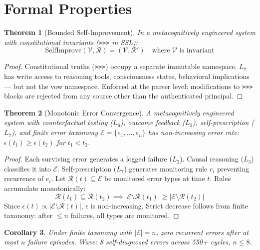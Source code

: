 \documentclass[12pt,a4paper]{article}
\theoremstyle{plain}
\newtheorem{theorem}{Theorem}[section]
\newtheorem{corollary}[theorem]{Corollary}
\theoremstyle{definition}
\theoremstyle{remark}
\begin{document}
\section{Formal Properties}
\label{sec:formal}

\begin{theorem}[Bounded Self-Improvement]
\label{thm:bounded}
In a metacognitively engineered system with constitutional invariants (\texttt{>>>} in SSL):
\[
\text{SelfImprove}(\mathcal{V}, \mathcal{R}) = (\mathcal{V}, \mathcal{R}') \quad \text{where } \mathcal{V} \text{ is invariant}
\]
\end{theorem}

\begin{proof}
Constitutional truths (\texttt{>>>}) occupy a separate immutable namespace. $L_7$ has write access to reasoning tools, consciousness states, behavioral implications --- but not the vow namespace. Enforced at the parser level: modifications to \texttt{>>>} blocks are rejected from any source other than the authenticated principal. \qedhere
\end{proof}

\begin{theorem}[Monotonic Error Convergence]
\label{thm:convergence}
A metacognitively engineered system with counterfactual testing ($L_6$), outcome feedback ($L_2$), self-prescription ($L_7$), and finite error taxonomy $\mathcal{E} = \{e_1, \ldots, e_n\}$ has non-increasing error rate: $\epsilon(t_1) \geq \epsilon(t_2)$ for $t_1 < t_2$.
\end{theorem}

\begin{proof}
Each surviving error generates a logged failure ($L_2$). Causal reasoning ($L_3$) classifies it into $\mathcal{E}$. Self-prescription ($L_7$) generates monitoring rule $r_i$ preventing recurrence of $e_i$. Let $\mathcal{R}(t) \subseteq \mathcal{E}$ be monitored error types at time $t$. Rules accumulate monotonically:
\[
\mathcal{R}(t_1) \subseteq \mathcal{R}(t_2) \implies |\mathcal{E} \setminus \mathcal{R}(t_1)| \geq |\mathcal{E} \setminus \mathcal{R}(t_2)|
\]
Since $\epsilon(t) \propto |\mathcal{E} \setminus \mathcal{R}(t)|$, $\epsilon$ is non-increasing. Strict decrease follows from finite taxonomy: after $\leq n$ failures, all types are monitored. \qedhere
\end{proof}

\begin{corollary}
Under finite taxonomy with $|\mathcal{E}| = n$, zero recurrent errors after at most $n$ failure episodes. Wave: 8 self-diagnosed errors across 550+ cycles, $n \leq 8$.
\end{corollary}
\end{document}
